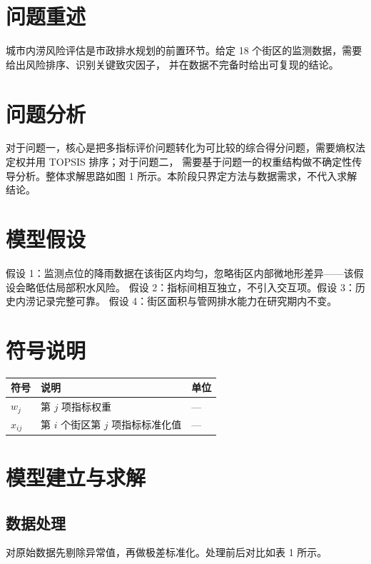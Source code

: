 \documentclass[12pt]{article}
\begin{document}
\begin{abstract}
城市内涝频发且影响面广，如何在有限监测数据下给出可解释的风险排序，是本文要回答的核心问题。针对问题一，
采用熵权法确定 8 项指标权重（不含主观赋权），构建风险评价模型，得到高风险街区 12 个、最高综合得分 0.83；
针对问题二，在降雨强度 ±15\% 扰动下以蒙特卡洛模拟检验排序稳健性，结论排序的前 5 名保持不变。

\noindent\textbf{关键词}：城市内涝；改进 TOPSIS；蒙特卡洛模拟；灵敏度分析
\end{abstract}

\section{问题重述}
城市内涝风险评估是市政排水规划的前置环节。给定 18 个街区的监测数据，需要给出风险排序、识别关键致灾因子，
并在数据不完备时给出可复现的结论。

\section{问题分析}
对于问题一，核心是把多指标评价问题转化为可比较的综合得分问题，需要熵权法定权并用 TOPSIS 排序；对于问题二，
需要基于问题一的权重结构做不确定性传导分析。整体求解思路如图 1 所示。本阶段只界定方法与数据需求，不代入求解结论。

\section{模型假设}
假设 1：监测点位的降雨数据在该街区内均匀，忽略街区内部微地形差异——该假设会略低估局部积水风险。
假设 2：指标间相互独立，不引入交互项。假设 3：历史内涝记录完整可靠。
假设 4：街区面积与管网排水能力在研究期内不变。

\section{符号说明}
\begin{tabular}{lll}
\toprule
符号 & 说明 & 单位 \\
\midrule
$w_j$ & 第 $j$ 项指标权重 & --- \\
$x_{ij}$ & 第 $i$ 个街区第 $j$ 项指标标准化值 & --- \\
\bottomrule
\end{tabular}

\section{模型建立与求解}
\subsection{数据处理}
对原始数据先剔除异常值，再做极差标准化。处理前后对比如表 1 所示。
\end{document}

